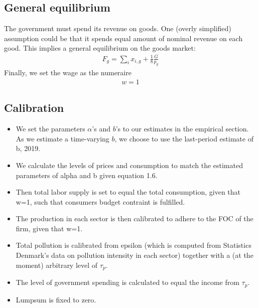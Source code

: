 \subsection{General equilibrium}
The government must spend its revenue on goods. One (overly simplified) assumption could be that it spends equal amount of nominal revenue on each good. This implies a general equilibrium on the goods market: 
\begin{align}
    F_g = \sum_i x_{i,g} + \frac{1}{8}\frac{G}{p_g}
\end{align}
Finally, we set the wage as the numeraire
\begin{align}
    w=1
\end{align}

\subsection{Calibration}
\begin{itemize}
\item We set the parameters $\alpha$'s and $b$'s to our estimates in the empirical section. As we estimate a time-varying $b$, we choose to use the last-period estimate of b, 2019. 
\item We calculate the levels of prices and consumption to match the estimated parameters of alpha and b given equation 1.6. 
\item Then total labor supply is set to equal the total consumption, given that w=1, such that consumers budget contraint is fulfilled. 
\item The production in each sector is then calibrated to adhere to the FOC of the firm, given that w=1. 
\item Total pollution is calibrated from epsilon (which is computed from Statistics Denmark's data on pollution intensity in each sector) together with a (at the moment) arbitrary level of $\tau_p$. 
\item The level of government spending is calculated to equal the income from $\tau_p$.
\item Lumpsum is fixed to zero.
\end{itemize}

